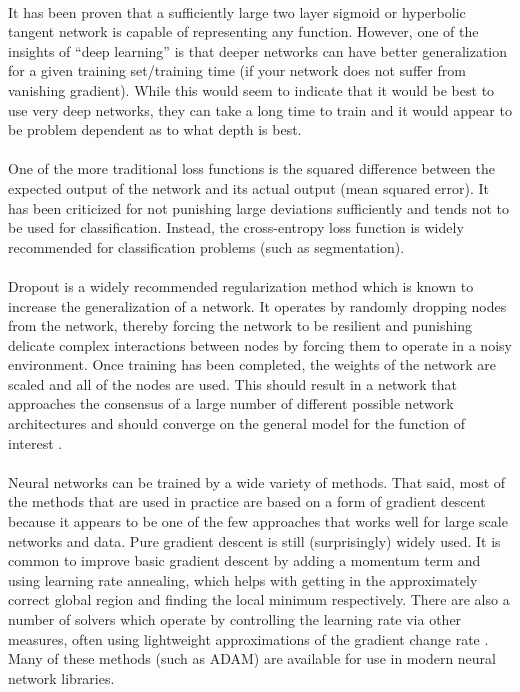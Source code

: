 \documentclass[12pt]{article}
\begin{document}
\\
	It has been proven that a sufficiently large two layer sigmoid or hyperbolic tangent network is capable of representing any function.  However, one of the insights of “deep learning” is that deeper networks can have better generalization for a given training set/training time (if your network does not suffer from vanishing gradient).  While this would seem to indicate that it would be best to use very deep networks,  they can take a long time to train and it would appear to be problem dependent as to what depth is best.\\
\\
	One of the more traditional loss functions is the squared difference between the expected output of the network and its actual output (mean squared error).  It has been criticized for not punishing large deviations sufficiently and tends not to be used for classification.  Instead, the cross-entropy loss function is widely recommended for classification problems (such as segmentation).\\
\\
	Dropout is a widely recommended regularization method which is known to increase the generalization of a network.  It operates by randomly dropping nodes from the network, thereby forcing the network to be resilient and punishing delicate complex interactions between nodes by forcing them to operate in a noisy environment.  Once training has been completed, the weights of the network are scaled and all of the nodes are used.  This should result in a network that approaches the consensus of a large number of different possible network architectures and should converge on the general model for the function of interest \cite{srivastava2014dropout}.\\
\\
	Neural networks can be trained by a wide variety of methods.  That said, most of the methods that are used in practice are based on a form of gradient descent because it appears to be one of the few approaches that works well for large scale networks and data.  Pure gradient descent is still (surprisingly) widely used.  It is common to improve basic gradient descent by adding a momentum term and using learning rate annealing, which helps with getting in the approximately correct global region and finding the local minimum respectively. There are also a number of solvers which operate by controlling the learning rate via other measures, often using lightweight approximations of the gradient change rate \cite{gradientDescentMethods}.  Many of these methods (such as ADAM) are available for use in modern neural network libraries.\\
\end{document}
